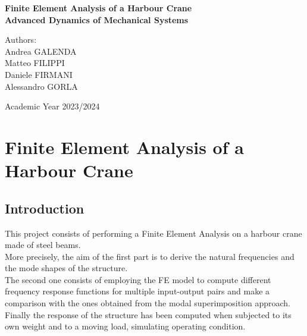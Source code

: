 \documentclass[12pt]{report}
\begin{document}
\begin{titlepage}
    \centering
    \vspace*{2cm}
    \huge \textbf{Finite Element Analysis of a Harbour Crane}\\ 
    \vspace*{1cm}
    \Large \textbf{Advanced Dynamics of Mechanical Systems}\\
    \vspace{2.5cm}
    \Large
    \begin{flushright}
    Authors:\\
    \vspace{0.1cm}
    Andrea GALENDA\\Matteo FILIPPI\\Daniele FIRMANI\\Alessandro GORLA
    \end{flushright}
    \vspace{1cm}
    \vfill
    {\Large Academic Year 2023/2024\par}
\end{titlepage}

\newpage
\begin{abstract}
This report presents a Finite Element Analysis (FEA) of a harbour crane composed of steel beams. A custom FE model was developed to derive the natural frequencies and mode shapes of the structure. The analysis further explores Frequency Response Functions (FRFs) using both full FE and modal superposition approaches. Finally, the structural response is evaluated under static loads and dynamic moving loads to simulate real-world operating conditions.
\end{abstract}

\tableofcontents
\newpage



\chapter{Finite Element Analysis of a Harbour Crane}
\section{Introduction}
This project consists of performing a Finite Element Analysis on a harbour crane made of steel beams.\\
More precisely, the aim of the first part is to derive the natural frequencies and the mode shapes of the structure.\\ 
The second one consists of employing the FE model to compute different frequency response functions for multiple input-output pairs and make a comparison with the ones obtained from the modal superimposition approach. \\
Finally the response of the structure has been computed when subjected to its own weight and to a moving load, simulating operating condition.
\end{document}
